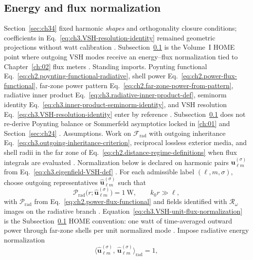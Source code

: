 \subsection{Energy and flux normalization}
\label{sec:ch351}
Section~\ref{sec:ch34} fixed harmonic \emph{shapes} and orthogonality closure conditions; coefficients in
Eq.~\eqref{eq:ch3.VSH-resolution-identity} remained geometric projections without watt calibration
\cite{stratton1941}. Subsection~\ref{sec:ch351} is the Volume~I HOME point where
outgoing VSH modes receive an energy--flux normalization tied to Chapter~\ref{ch:02} flux meters
\cite{poynting1884}.
Standing imports. Poynting functional Eq.~\eqref{eq:ch2.poynting-functional-radiative}, shell power
Eq.~\eqref{eq:ch2.power-flux-functional}, far-zone power pattern
Eq.~\eqref{eq:ch2.far-zone-power-from-pattern}, radiative inner product
Eq.~\eqref{eq:ch3.radiative-inner-product-def}, seminorm identity
Eq.~\eqref{eq:ch3.inner-product-seminorm-identity}, and VSH resolution
Eq.~\eqref{eq:ch3.VSH-resolution-identity} enter by reference \cite{stratton1941}.
Subsection~\ref{sec:ch351} does not re-derive Poynting balance or Sommerfeld asymptotics locked in
\ref{ch:01} and Section~\ref{sec:ch24} \cite{stratton1941}.
Assumptions. Work on \(\mathcal{F}_{\mathrm{rad}}\) with outgoing inheritance
Eq.~\eqref{eq:ch3.outgoing-inheritance-criterion}, reciprocal lossless exterior media, and shell radii in the
far zone of Eq.~\eqref{eq:ch2.distance-regime-definitions} when flux integrals are evaluated
\cite{stratton1941}. Normalization below is declared on harmonic pairs
\(\mathbf{u}_{\ell m}^{(\sigma)}\) from Eq.~\eqref{eq:ch3.eigenfield-VSH-def} \cite{hansen1988}.
For each admissible label \((\ell,m,\sigma)\), choose outgoing representatives
\(\widehat{\mathbf{u}}_{\ell m}^{(\sigma)}\) such that
\begin{equation}
\label{eq:ch3.VSH-unit-flux-normalization}
\mathcal{P}_{\mathrm{rad}}\!\bigl(r;\widehat{\mathbf{u}}_{\ell m}^{(\sigma)}\bigr)
=
1\ \mathrm{W},
\qquad
k_{0}r\gg\ell,
\end{equation}
with \(\mathcal{P}_{\mathrm{rad}}\) from Eq.~\eqref{eq:ch2.power-flux-functional} and fields identified with
\(\mathcal{R}_\omega\) images on the radiative branch \cite{stratton1941}.
Equation~\eqref{eq:ch3.VSH-unit-flux-normalization} is the Subsection~\ref{sec:ch351} HOME convention: one watt of
time-averaged outward power through far-zone shells per unit normalized mode \cite{harrington2001}.
Impose radiative energy normalization
\begin{equation}
\label{eq:ch3.VSH-unit-energy-norm}
\big\langle \widehat{\mathbf{u}}_{\ell m}^{(\sigma)},\,\widehat{\mathbf{u}}_{\ell m}^{(\sigma)}\big\rangle_{\mathrm{rad}}
=
1,
\end{equation}

